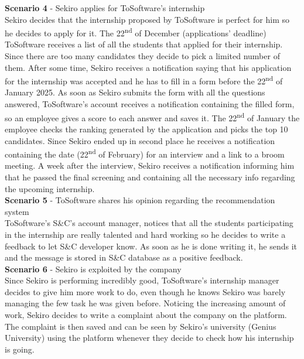 \documentclass[11pt,twoside]{article}
\begin{document}
\vspace{1\baselineskip}
\textbf{\large{Scenario 4}} - Sekiro applies for ToSoftware's internship \\
Sekiro decides that the internship proposed by ToSoftware is perfect for him so he decides to apply for it. The 22\textsuperscript{nd} of December (applications' deadline) ToSoftware receives a list of all the students that applied for their internship. Since there are too many candidates they decide to pick a limited number of them. After some time, Sekiro receives a notification saying that his application for the internship was accepted and he has to fill in a form before the 22\textsuperscript{nd} of January 2025. As soon as Sekiro submits the form with all the questions answered, ToSoftware's account receives a notification containing the filled form, so an employee gives a score to each answer and saves it. The 22\textsuperscript{nd} of January the employee checks the ranking generated by the application and picks the top 10 candidates. Since Sekiro ended up in second place he receives a notification containing the date (22\textsuperscript{nd} of February) for an interview and a link to a broom meeting. A week after the interview, Sekiro receives a notification informing him that he passed the final screening and containing all the necessary info regarding the upcoming internship.  
\vspace{1\baselineskip} \\
\textbf{\large{Scenario 5}} - ToSoftware shares his opinion regarding the recommendation system \\
ToSoftware's S\&C's account manager, notices that all the students participating in the internship are really talented and hard working so he decides to write a feedback to let S\&C developer know. As soon as he is done writing it, he sends it and the message is stored in S\&C database as a positive feedback.
\vspace{1\baselineskip} \\
\textbf{\large{Scenario 6}} - Sekiro is exploited by the company \\
Since Sekiro is performing incredibly good, ToSoftware's internship manager decides to give him more work to do, even though he knows Sekiro was barely managing the few task he was given before. Noticing the increasing amount of work, Sekiro decides to write a complaint about the company on the platform. The complaint is then saved and can be seen by Sekiro's university (Genius University) using the platform whenever they decide to check how his internship is going.
\end{document}

